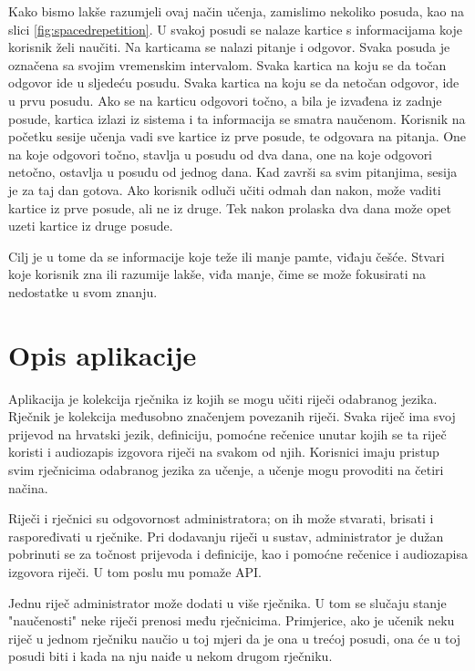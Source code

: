Kako bismo lakše razumjeli ovaj način učenja, zamislimo nekoliko posuda, kao na slici \ref{fig:spacedrepetition}. 
U svakoj posudi se nalaze kartice s informacijama koje korisnik želi naučiti. Na karticama se nalazi pitanje i odgovor. 
Svaka posuda je označena sa svojim vremenskim intervalom. Svaka kartica na koju se da točan odgovor ide u sljedeću posudu.
 Svaka kartica na koju se da netočan odgovor, ide u prvu posudu. Ako se na karticu odgovori točno, a bila je izvađena iz zadnje 
 posude, kartica izlazi iz sistema i ta informacija se smatra naučenom. Korisnik na početku sesije učenja vadi sve kartice iz prve 
 posude, te odgovara na pitanja. One na koje odgovori točno, stavlja u posudu od dva dana, one na koje odgovori netočno, ostavlja u 
 posudu od jednog dana. Kad završi sa svim pitanjima, sesija je za taj dan gotova. Ako korisnik odluči učiti odmah dan nakon, može vaditi 
 kartice iz prve posude, ali ne iz druge. Tek nakon prolaska dva dana može opet uzeti kartice iz druge posude.

Cilj je u tome da se informacije koje teže ili manje pamte, viđaju češće. Stvari koje korisnik zna ili razumije lakše, viđa manje, čime se može fokusirati na nedostatke u svom znanju.

\eject
\section{Opis aplikacije}

Aplikacija je kolekcija rječnika iz kojih se mogu učiti riječi odabranog jezika. Rječnik je kolekcija međusobno značenjem povezanih riječi. 
Svaka riječ ima svoj prijevod na hrvatski jezik, definiciju, pomoćne rečenice unutar kojih se 
ta riječ koristi i audiozapis izgovora riječi na svakom od njih.
Korisnici imaju pristup svim rječnicima odabranog jezika za učenje, a učenje mogu provoditi na četiri načina.

Riječi i rječnici su odgovornost administratora; on ih može stvarati, brisati i raspoređivati u rječnike. Pri dodavanju riječi u sustav, administrator je dužan pobrinuti se za točnost 
prijevoda i definicije, kao i pomoćne rečenice i audiozapisa izgovora riječi. U tom poslu mu pomaže API. 

Jednu riječ administrator može dodati u više rječnika. U tom se slučaju stanje "naučenosti" neke riječi prenosi među rječnicima. Primjerice, ako je učenik neku riječ u jednom rječniku naučio u toj mjeri da je ona u trećoj posudi, ona će u toj posudi biti i kada na nju naiđe u nekom drugom rječniku. 

